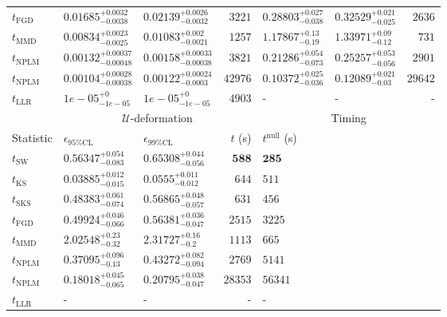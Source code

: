 \begin{tabular}{l|llr|llr}
	$t_{\mathrm{FGD}}$ & $0.01685_{-0.0038}^{+0.0032}$ & $0.02139_{-0.0032}^{+0.0026}$ & $3221$ & $0.28803_{-0.038}^{+0.027}$ & $0.32529_{-0.025}^{+0.021}$ & $2636$ \\
	$t_{\mathrm{MMD}}$ & $0.00834_{-0.0025}^{+0.0023}$ & $0.01083_{-0.0021}^{+0.002}$ & $1257$ & $1.17867_{-0.19}^{+0.13}$ & $1.33971_{-0.12}^{+0.09}$ & $731$ \\
\rowcolor{red!35}	$t_{\mathrm{NPLM}}$ & $0.00132_{-0.00048}^{+0.00037}$ & $0.00158_{-0.00038}^{+0.00033}$ & $3821$ & $0.21286_{-0.073}^{+0.054}$ & $0.25257_{-0.056}^{+0.053}$ & $2901$ \\
\rowcolor{blue!35}	$t_{\mathrm{NPLM}}$ & $0.00104_{-0.00038}^{+0.00028}$ & $0.00122_{-0.0003}^{+0.00024}$ & $42976$ & $0.10372_{-0.036}^{+0.025}$ & $0.12089_{-0.03}^{+0.021}$ & $29642$ \\
	$t_{\mathrm{LLR}}$ & $1e-05_{-1e-05}^{+0}$ & $1e-05_{-1e-05}^{+0}$ & $4903$ & - & - & - \\
	\toprule
	\multicolumn{1}{c}{} & \multicolumn{3}{c}{$\mathcal{U}$-deformation} & \multicolumn{3}{c}{Timing} \\
	Statistic & $\epsilon_{95\%\mathrm{CL}}$ & $\epsilon_{99\%\mathrm{CL}}$ & $t$ (s) & $t^{\mathrm{null}}$ (s) \\
	\midrule
	$t_{\mathrm{SW}}$ & $0.56347_{-0.083}^{+0.054}$ & $0.65308_{-0.056}^{+0.044}$ & ${\mathbf{588}}$ & ${\mathbf{285}}$ \\
	$t_{\overline{\mathrm{KS}}}$ & ${\mathbf{0.03885_{-0.015}^{+0.012}}}$ & ${\mathbf{0.0555_{-0.012}^{+0.011}}}$ & $644$ & $511$ \\
	$t_{\mathrm{SKS}}$ & $0.48383_{-0.074}^{+0.061}$ & $0.56865_{-0.057}^{+0.048}$ & $631$ & $456$ \\
	$t_{\mathrm{FGD}}$ & $0.49924_{-0.066}^{+0.046}$ & $0.56381_{-0.047}^{+0.036}$ & $2515$ & $3225$ \\
	$t_{\mathrm{MMD}}$ & $2.02548_{-0.32}^{+0.23}$ & $2.31727_{-0.2}^{+0.16}$ & $1113$ & $665$ \\
\rowcolor{red!35}	$t_{\mathrm{NPLM}}$ & $0.37095_{-0.13}^{+0.096}$ & $0.43272_{-0.094}^{+0.082}$ & $2769$ & $5141$ \\
\rowcolor{blue!35}	$t_{\mathrm{NPLM}}$ & $0.18018_{-0.065}^{+0.045}$ & $0.20795_{-0.047}^{+0.038}$ & $28353$ & $56341$ \\
	$t_{\mathrm{LLR}}$ & - & - & - & - \\
	\bottomrule
\end{tabular}